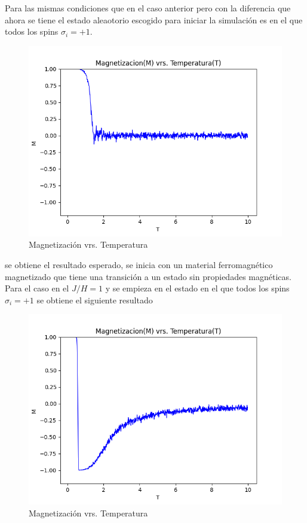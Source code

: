 \documentclass[a4paper]{article}
\begin{document}
Para las mismas condiciones que en el caso anterior pero con la diferencia que ahora se tiene el estado aleaotorio escogido para iniciar la simulación es en el que todos los spins $\sigma_i=+1$. 
\begin{figure}[H]
\begin{center}
\includegraphics[scale=0.6]{PlotMvT_sim2.png} 
\end{center} 
\caption{Magnetización vrs. Temperatura}
\end{figure}
se obtiene el resultado esperado, se inicia con un material ferromagnético magnetizado que tiene una transición a un estado sin propiedades magnéticas.\\
Para el caso en el $J/H=1$ y se empieza en el estado en el que todos los spins $\sigma_i=+1$ se obtiene el siguiente resultado
\begin{figure}[H]
\begin{center}
\includegraphics[scale=0.6]{PlotMvT_sim3.png} 
\end{center} 
\caption{Magnetización vrs. Temperatura}
\end{figure}
\end{document}
